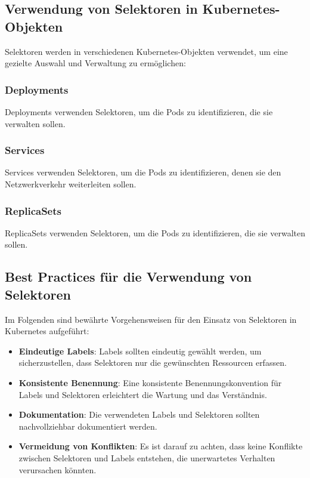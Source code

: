 \newpage
\subsection{Verwendung von Selektoren in Kubernetes-Objekten}
Selektoren werden in verschiedenen Kubernetes-Objekten verwendet, um eine gezielte Auswahl und Verwaltung zu ermöglichen:
\subsubsection{Deployments}
Deployments verwenden Selektoren, um die Pods zu identifizieren, die sie verwalten sollen.\\

\subsubsection{Services}
Services verwenden Selektoren, um die Pods zu identifizieren, denen sie den Netzwerkverkehr weiterleiten sollen.\\

\newpage
\subsubsection{ReplicaSets}
ReplicaSets verwenden Selektoren, um die Pods zu identifizieren, die sie verwalten sollen.\\


\subsection{Best Practices für die Verwendung von Selektoren}
Im Folgenden sind bewährte Vorgehensweisen für den Einsatz von Selektoren in Kubernetes aufgeführt:

\begin{itemize}
    \item \textbf{Eindeutige Labels}: Labels sollten eindeutig gewählt werden, um sicherzustellen, dass Selektoren nur die gewünschten Ressourcen erfassen.
    \item \textbf{Konsistente Benennung}: Eine konsistente Benennungskonvention für Labels und Selektoren erleichtert die Wartung und das Verständnis.
    \item \textbf{Dokumentation}: Die verwendeten Labels und Selektoren sollten nachvollziehbar dokumentiert werden.
    \item \textbf{Vermeidung von Konflikten}: Es ist darauf zu achten, dass keine Konflikte zwischen Selektoren und Labels entstehen, die unerwartetes Verhalten verursachen könnten.
\end{itemize}

